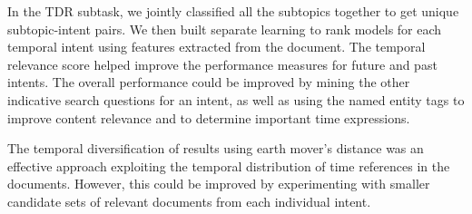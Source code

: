 \documentclass{sig-alternate}
\begin{document}
In the TDR subtask, we jointly classified all the subtopics together to get unique subtopic-intent pairs. We then built separate learning to rank models for each temporal intent using features extracted from the document. The temporal relevance score helped improve the performance measures for future and past intents. The overall performance could be improved by mining the other indicative search questions for an intent, as well as using the named entity tags to improve content relevance and to determine important time expressions.

The temporal diversification of results using earth mover's distance was an effective approach exploiting the temporal distribution of time references in the documents. However, this could be improved by experimenting with smaller candidate sets of relevant documents from each individual intent.



\end{document}

